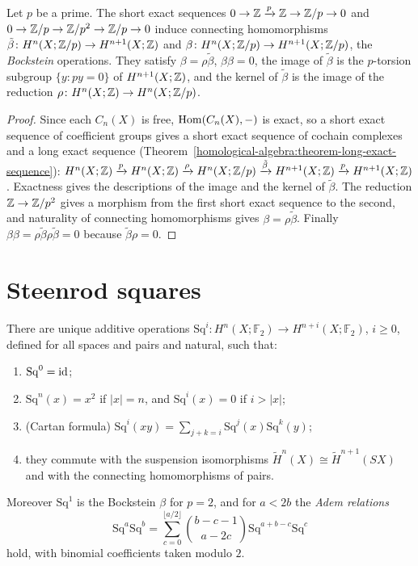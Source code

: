 \begin{proposition}\label{cohomology-operations:proposition-bockstein}
Let $p$ be a prime. The short exact sequences $0 \to \mathbb{Z} \xrightarrow{p} \mathbb{Z} \to \mathbb{Z}/p \to 0$ and $0 \to \mathbb{Z}/p \to \mathbb{Z}/p^2 \to \mathbb{Z}/p \to 0$ induce connecting homomorphisms
$\tilde\beta \colon H^n(X; \mathbb{Z}/p) \to H^{n+1}(X; \mathbb{Z})$ and $\beta \colon H^n(X; \mathbb{Z}/p) \to H^{n+1}(X; \mathbb{Z}/p)$, the \emph{Bockstein} operations. They satisfy $\beta = \rho\tilde\beta$,
$\beta\beta = 0$, the image of $\tilde\beta$ is the $p$-torsion subgroup $\{y : py = 0\}$ of $H^{n+1}(X; \mathbb{Z})$, and the kernel of $\tilde\beta$ is the image of the reduction
$\rho \colon H^n(X; \mathbb{Z}) \to H^n(X; \mathbb{Z}/p)$.
\end{proposition}

\begin{proof}
Since each $C_n(X)$ is free, $\operatorname{Hom}(C_n(X), -)$ is exact, so a short exact sequence of coefficient groups gives a short exact sequence of cochain complexes and a long exact
sequence (Theorem~\ref{homological-algebra:theorem-long-exact-sequence}):
$H^n(X; \mathbb{Z}) \xrightarrow{p} H^n(X; \mathbb{Z}) \xrightarrow{\rho} H^n(X; \mathbb{Z}/p) \xrightarrow{\tilde\beta} H^{n+1}(X; \mathbb{Z}) \xrightarrow{p} H^{n+1}(X; \mathbb{Z})$. Exactness gives the descriptions of the image
and the kernel of $\tilde\beta$. The reduction $\mathbb{Z} \to \mathbb{Z}/p^2$ gives a morphism from the first short exact sequence to the second, and naturality of connecting homomorphisms
gives $\beta = \rho\tilde\beta$. Finally $\beta\beta = \rho\tilde\beta\rho\tilde\beta = 0$ because $\tilde\beta\rho = 0$.
\end{proof}

\section{Steenrod squares}\label{cohomology-operations:section-steenrod-squares}

\begin{theorem}[Steenrod]\label{cohomology-operations:theorem-steenrod-squares}
There are unique additive operations $\mathrm{Sq}^i \colon H^n(X; \mathbb{F}_2) \to H^{n+i}(X; \mathbb{F}_2)$, $i \geq 0$, defined for all spaces and pairs and natural, such that:
\begin{enumerate}
\item $\mathrm{Sq}^0 = \mathrm{id}$;
\item $\mathrm{Sq}^n(x) = x^2$ if $|x| = n$, and $\mathrm{Sq}^i(x) = 0$ if $i > |x|$;
\item (Cartan formula) $\mathrm{Sq}^i(xy) = \sum_{j+k=i}\mathrm{Sq}^j(x)\mathrm{Sq}^k(y)$;
\item they commute with the suspension isomorphisms $\tilde{H}^n(X) \cong \tilde{H}^{n+1}(SX)$ and with the connecting homomorphisms of pairs.
\end{enumerate}
Moreover $\mathrm{Sq}^1$ is the Bockstein $\beta$ for $p = 2$, and for $a < 2b$ the \emph{Adem relations}
\[
\mathrm{Sq}^a\mathrm{Sq}^b = \sum_{c=0}^{\lfloor a/2 \rfloor}\binom{b - c - 1}{a - 2c}\mathrm{Sq}^{a+b-c}\mathrm{Sq}^c
\]
hold, with binomial coefficients taken modulo $2$.
\end{theorem}

